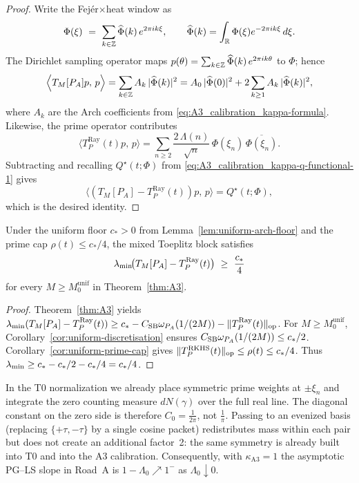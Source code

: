\begin{proof}
Write the Fej\'er$\times$heat window as
\[
  \Phi(\xi)\ =\ \sum_{k\in\mathbb Z} \widehat \Phi(k)\,e^{2\pi i k\xi},\qquad
  \widehat \Phi(k) = \int_{\mathbb R}\Phi(\xi)e^{-2\pi i k\xi}\,d\xi.
\]
The Dirichlet sampling operator maps $p(\theta)=\sum_{k\in\mathbb Z} \widehat \Phi(k)\,e^{2\pi i k\theta}$ to $\Phi$; hence
\[
  \Big\langle T_M[P_A]p,\,p\Big\rangle
  = \sum_{k\in\mathbb Z} A_k\,|\widehat \Phi(k)|^2
  = A_0\,|\widehat \Phi(0)|^2 + 2\sum_{k\ge1}A_k\,|\widehat \Phi(k)|^2,
\]
where $A_k$ are the Arch coefficients from \eqref{eq:A3_calibration_kappa-formula}.  Likewise, the
prime operator contributes
\[
  \Big\langle T_P^{\mathrm{Ray}}(t) p,\,p\Big\rangle
  = \sum_{n\ge2} \frac{2\,\Lambda(n)}{\sqrt{n}}\,\Phi(\xi_n)\,\overline{\Phi(\xi_n)}.
\]
Subtracting and recalling $Q^\star(t;\Phi)$ from \eqref{eq:A3_calibration_kappa-q-functional-1} gives
\[
  \Big\langle (T_M[P_A]-T_P^{\mathrm{Ray}}(t))p,\,p\Big\rangle
  = Q^\star(t;\Phi),
\]
which is the desired identity.
\end{proof}

\begin{proposition}\label{prop:a3-calib}
Under the uniform floor $c_*>0$ from Lemma~\ref{lem:uniform-arch-floor} and the prime cap $\rho(t)\le c_*/4$, the mixed Toeplitz block satisfies
\[
  \lammin\!\bigl(T_M[\Pa]-T_P^{\mathrm{Ray}}(t)\bigr)\ \ge\ \frac{c_*}{4}
\]
for every $M\ge M_0^{\mathrm{unif}}$ in Theorem~\ref{thm:A3}.
\end{proposition}

\begin{proof}
Theorem~\ref{thm:A3} yields $\lambda_{\min}(T_M[P_A]-T_P^{\mathrm{Ray}}(t))\ge c_*-C_{\mathrm{SB}}\omega_{P_A}(1/(2M))-\|T_P^{\mathrm{Ray}}(t)\|_{\mathrm{op}}$.
For $M\ge M_0^{\mathrm{unif}}$, Corollary~\ref{cor:uniform-discretisation} ensures $C_{\mathrm{SB}}\omega_{P_A}(1/(2M))\le c_*/2$.
Corollary~\ref{cor:uniform-prime-cap} gives $\|T_P^{\mathrm{RKHS}}(t)\|_{\mathrm{op}}\le \rho(t) \le c_*/4$.
Thus $\lambda_{\min} \ge c_* - c_*/2 - c_*/4 = c_*/4$.
\end{proof}

\begin{remark}
In the T0 normalization we already place symmetric prime weights at $\pm\xi_n$ and integrate the zero counting measure $dN(\gamma)$ over the full real line. The diagonal constant on the zero side is therefore $C_0=\tfrac{1}{2\pi}$, not $\tfrac{1}{\pi}$. Passing to an evenized basis (replacing $\{+\tau,-\tau\}$ by a single cosine packet) redistributes mass within each pair but does not create an additional factor~2: the same symmetry is already built into T0 and into the A3 calibration. Consequently, with $\kappa_{\mathrm{A3}}=1$ the asymptotic PG--LS slope in Road~A is $1-\Lambda_0\nearrow1^-$ as $\Lambda_0\downarrow0$.
\end{remark}

